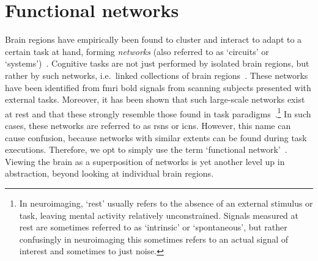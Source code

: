 \clearpage
\section{Functional networks}\label{sec:functional-brain-networks}

Brain regions have empirically been found to cluster and interact to adapt to a certain task at hand, forming \emph{networks} (also referred to as `circuits' or `systems')~\parencite{Fox2007}.
Cognitive tasks are not just performed by isolated brain regions, but rather by such networks, i.e.~linked collections of brain regions~\parencite{Bressler2010}.
%
These networks have been identified from \gls{fmri} \gls{bold} signals from scanning subjects presented with external tasks.
Moreover, it has been shown that such large-scale networks exist at rest and that these strongly resemble those found in task paradigms~\parencite{Smith2009}.\footnote{In neuroimaging, `rest' usually refers to the absence of an external stimulus or task, leaving mental activity relatively unconstrained. Signals measured at rest are sometimes referred to as `intrinsic' or `spontaneous', but rather confusingly in neuroimaging this sometimes refers to an actual signal of interest and sometimes to just noise.}
In such cases, these networks are referred to as \glspl{rsn} or \glspl{icn}.
However, this name can cause confusion, because networks with similar extents can be found during task executions.
Therefore, we opt to simply use the term `functional network'~\parencite[FN; see also][]{Finn2021}.
Viewing the brain as a superposition of networks is yet another level up in abstraction, beyond looking at individual brain regions.

